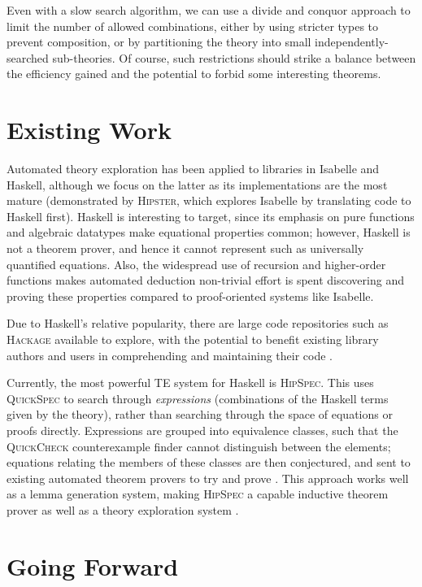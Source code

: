 \documentclass{eceasst}
\begin{document}
Even with a slow search algorithm, we can use a divide and conquor
approach to limit the number of allowed combinations, either by using
stricter types to prevent composition, or by partitioning the theory
into small independently-searched sub-theories. Of course, such
restrictions should strike a balance between the efficiency gained and
the potential to forbid some interesting theorems.

\section{Existing Work}

Automated theory exploration has been applied to libraries in Isabelle
and Haskell, although we focus on the latter as its implementations are
the most mature (demonstrated by \textsc{Hipster}, which explores Isabelle by
translating code to Haskell first). Haskell is interesting to target,
since its emphasis on pure functions and algebraic datatypes make equational
properties common; however, Haskell is not a theorem prover, and hence it cannot
represent such as universally quantified equations. Also, the widespread use of
recursion and higher-order functions makes automated deduction non-trivial
effort is spent discovering and proving these properties compared to
proof-oriented systems like Isabelle.

Due to Haskell's relative popularity, there are large code repositories
such as \textsc{Hackage} available to explore, with the potential to
benefit existing library authors and users in comprehending and
maintaining their code \cite{QuickSpec}.

Currently, the most powerful TE system for Haskell is \textsc{HipSpec}.
This uses \textsc{QuickSpec} to search through \emph{expressions}
(combinations of the Haskell terms given by the theory), rather than
searching through the space of equations or proofs directly. Expressions
are grouped into equivalence classes, such that the \textsc{QuickCheck}
counterexample finder cannot distinguish between the elements; equations
relating the members of these classes are then conjectured, and sent to
existing automated theorem provers to try and prove \cite{rosen2012proving}. This
approach works well as a lemma generation system, making
\textsc{HipSpec} a capable inductive theorem prover as well as a theory
exploration system \cite{claessen2013automating}.

\section{Going Forward}
\end{document}

